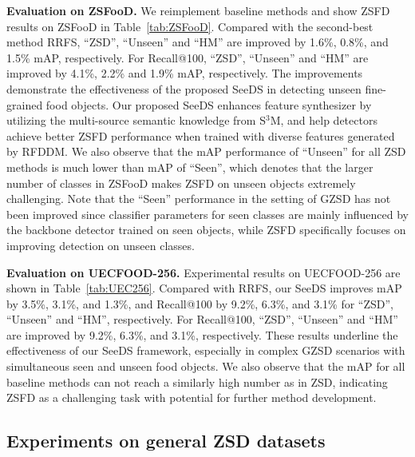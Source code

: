 \noindent\textbf{Evaluation on ZSFooD.}
We reimplement baseline methods and show ZSFD results on ZSFooD in Table~\ref{tab:ZSFooD}. Compared with the second-best method RRFS, ``ZSD'', ``Unseen'' and ``HM'' are improved by 1.6\%, 0.8\%, and 1.5\% mAP, respectively. For Recall@100, ``ZSD'', ``Unseen'' and ``HM'' are improved by 4.1\%, 2.2\% and 1.9\% mAP, respectively. The improvements demonstrate the effectiveness of the proposed SeeDS in detecting unseen fine-grained food objects. Our proposed SeeDS enhances feature synthesizer by utilizing the multi-source semantic knowledge from S$^3$M, and help detectors achieve better ZSFD performance when trained with diverse features generated by RFDDM. We also observe that the mAP performance of ``Unseen'' for all ZSD methods is much lower than mAP of ``Seen'', which denotes that the larger number of classes in ZSFooD makes ZSFD on unseen objects extremely challenging. Note that the ``Seen'' performance in the setting of GZSD has not been improved since classifier parameters for seen classes are mainly influenced by the backbone detector trained on seen objects, while ZSFD specifically focuses on improving detection on unseen classes.

\noindent\textbf{Evaluation on UECFOOD-256.} 
Experimental results on UECFOOD-256 are shown in Table~\ref{tab:UEC256}. Compared with RRFS, our SeeDS improves mAP by 3.5\%, 3.1\%, and 1.3\%, and Recall@100 by 9.2\%, 6.3\%, and 3.1\% for ``ZSD'', ``Unseen'' and ``HM'', respectively. For Recall@100, ``ZSD'', ``Unseen'' and ``HM'' are improved by 9.2\%, 6.3\%, and 3.1\%, respectively. These results underline the effectiveness of our SeeDS framework, especially in complex GZSD scenarios with simultaneous seen and unseen food objects. We also observe that the mAP for all baseline methods can not reach a similarly high number as in ZSD, indicating ZSFD as a challenging task with potential for further method development.

\subsection{Experiments on general ZSD datasets}

